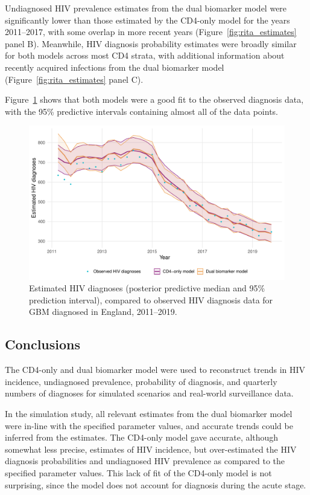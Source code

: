 Undiagnosed HIV prevalence estimates from the dual biomarker model were significantly lower than those estimated by the CD4-only model for the years 2011--2017, with some overlap in more recent years (Figure~\ref{fig:rita_estimates} panel B). Meanwhile, HIV diagnosis probability estimates were broadly similar for both models across most CD4 strata, with additional information about recently acquired infections from the dual biomarker model (Figure~\ref{fig:rita_estimates} panel C).

Figure~\ref{fig:diag_fit_rita} shows that both models were a good fit to the observed diagnosis data, with the 95\% predictive intervals containing almost all of the data points.

\begin{figure}[htbp!]
  \centering
  \includegraphics[width=\textwidth]{diag_fit_rita.pdf}
  \caption[Estimated HIV diagnoses (posterior predictive median and 95\% prediction interval) for GBM diagnosed in England, 2011--2019]{Estimated HIV diagnoses (posterior predictive median and 95\% prediction interval), compared to observed HIV diagnosis data for GBM diagnosed in England, 2011--2019.}\label{fig:diag_fit_rita}
\end{figure}

\subsection{Conclusions}

The CD4-only and dual biomarker model were used to reconstruct trends in HIV incidence, undiagnosed prevalence, probability of diagnosis, and quarterly numbers of diagnoses for simulated scenarios and real-world surveillance data.

In the simulation study, all relevant estimates from the dual biomarker model were in-line with the specified parameter values, and accurate trends could be inferred from the estimates. The CD4-only model gave accurate, although somewhat less precise, estimates of HIV incidence, but over-estimated the HIV diagnosis probabilities and undiagnosed HIV prevalence as compared to the specified parameter values. This lack of fit of the CD4-only model is not surprising, since the model does not account for diagnosis during the acute stage.

